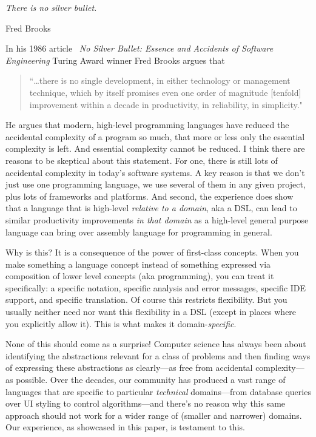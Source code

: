 \large
\noindent \phantom{xxxxxxxxxxxxxxxxxxxxxxxxxxxxxxxx} \emph{There is no silver bullet.}

\vspace{0.5mm}
\noindent \phantom{ixxxxxxxxxxxxxxxcxxxxxxxxxxxxxxxxxxxxxxxxxxxx} \small{Fred Brooks} 

\normalsize{}
\vspace{3mm}
\noindent 

\noindent In his 1986 article~\cite{Brooks87nosilver} \emph{No Silver Bullet: Essence and Accidents of Software Engineering} 
Turing Award winner Fred Brooks argues that 

\begin{quote}
``\ldots there is no single development, in either technology or management technique, which by itself promises even one order of magnitude [tenfold] improvement within a decade in productivity, in reliability, in simplicity."
\end{quote}

\noindent He argues that modern, high-level programming languages have reduced
the accidental complexity of a program so much, that more or less only the
essential complexity is left. And essential complexity cannot be reduced. I
think there are reasons to be skeptical about this statement. For one, there is
still lots of accidental complexity in today's software systems. A key reason is
that we don't just use one programming language, we use several of them in any
given project, plus lots of frameworks and platforms.
And second, the experience does show that a language that is high-level
\emph{relative to a domain}, aka a DSL, can lead to similar productivity
improvements \emph{in that domain} as a high-level general purpose language can
bring over assembly language for programming in general.

Why is this? It is a consequence of the power of first-class concepts. When you
make something a language concept instead of something expressed via composition
of lower level concepts (aka programming), you can treat it specifically: 
a specific notation, specific analysis and error messages, specific IDE support,
and specific translation. Of course this restricts flexibility. But you usually
neither need nor want this flexibility in a DSL (except in places where you 
explicitly allow it). This is what makes it domain-\emph{specific}.

  
None of this should come as a surprise! Computer science has always been about
identifying the abstractions relevant for a class of problems and then finding
ways of expressing these abstractions as clearly---as free from accidental
complexity---as possible. Over the decades, our community has produced a vast
range of languages that are specific to particular \emph{technical}
domains---from database queries over UI styling to control algorithms---and
there's no reason why this same approach should not work for a wider range of
(smaller and narrower) domains. Our experience, as showcased in this paper, is
testament to this.


